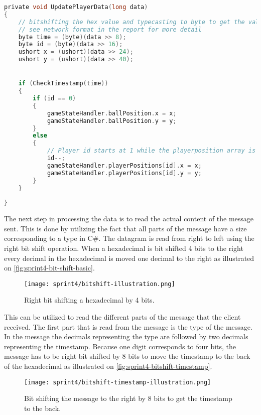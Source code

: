 \begin{lstlisting}[caption={Updating player data in UDP client}, captionpos=b,language=C,label={lst:updateplayerdata}]
private void UpdatePlayerData(long data)
{
    // bitshifting the hex value and typecasting to byte to get the values.
    // see network format in the report for more detail
    byte time = (byte)(data >> 8);
    byte id = (byte)(data >> 16);
    ushort x = (ushort)(data >> 24);
    ushort y = (ushort)(data >> 40);


    if (CheckTimestamp(time))
    {
        if (id == 0)
        {
            gameStateHandler.ballPosition.x = x;
            gameStateHandler.ballPosition.y = y;
        }
        else
        {
            // Player id starts at 1 while the playerposition array is 0 indexed. Decrementing id so that they line up.
            id--;
            gameStateHandler.playerPositions[id].x = x;
            gameStateHandler.playerPositions[id].y = y;
        }
    }
    
}
\end{lstlisting}
\noindent
The next step in processing the data is to read the actual content of the message sent.
This is done by utilizing the fact that all parts of the message have a size corresponding to a type in C\#.
The datagram is read from right to left using the right bit shift operation.
When a hexadecimal is bit shifted 4 bits to the right every decimal in the hexadecimal is moved one decimal to the right as illustrated on \autoref{fig:sprint4-bit-shift-basic}.
\begin{figure}[H]
    \centering
    \texttt{[image: sprint4/bitshift-illustration.png]}
    \caption{Right bit shifting a hexadecimal by 4 bits.}
    \label{fig:sprint4-bit-shift-basic}
\end{figure}
\noindent
This can be utilized to read the different parts of the message that the client received.
The first part that is read from the message is the type of the message.
In the message the decimals representing the type are followed by two decimals representing the timestamp.
Because one digit corresponds to four bits, the message has to be right bit shifted by 8 bits to move the timestamp to the back of the hexadecimal as illustrated on \autoref{fig:sprint4-bitshift-timestamp}.
\begin{figure}[H]
    \centering
    \texttt{[image: sprint4/bitshift-timestamp-illustration.png]}
    \caption{Bit shifting the message to the right by 8 bits to get the timestamp to the back.}
    \label{fig:sprint4-bitshift-timestamp}
\end{figure}
